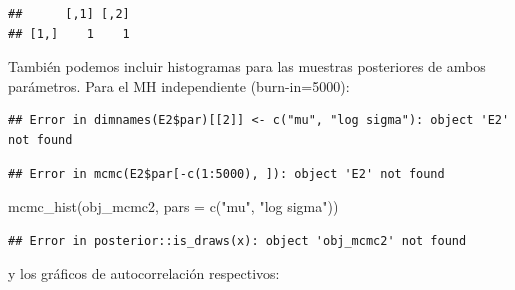 \documentclass[
  12pt,
]{book}
\newenvironment{Shaded}{\begin{snugshade}}{\end{snugshade}}
\newcommand{\AttributeTok}[1]{\textcolor[rgb]{0.77,0.63,0.00}{#1}}
\newcommand{\DecValTok}[1]{\textcolor[rgb]{0.00,0.00,0.81}{#1}}
\newcommand{\FunctionTok}[1]{\textcolor[rgb]{0.00,0.00,0.00}{#1}}
\newcommand{\NormalTok}[1]{#1}
\newcommand{\OtherTok}[1]{\textcolor[rgb]{0.56,0.35,0.01}{#1}}
\newcommand{\SpecialCharTok}[1]{\textcolor[rgb]{0.00,0.00,0.00}{#1}}
\newcommand{\StringTok}[1]{\textcolor[rgb]{0.31,0.60,0.02}{#1}}
\theoremstyle{definition}
\theoremstyle{definition}
\theoremstyle{definition}
\theoremstyle{definition}
\theoremstyle{remark}
\begin{document}
\begin{verbatim}
##      [,1] [,2]
## [1,]    1    1
\end{verbatim}

También podemos incluir histogramas para las muestras posteriores de ambos parámetros. Para el MH independiente (burn-in=5000):

\begin{Shaded}
\end{Shaded}

\begin{verbatim}
## Error in dimnames(E2$par)[[2]] <- c("mu", "log sigma"): object 'E2' not found
\end{verbatim}

\begin{Shaded}
\end{Shaded}

\begin{verbatim}
## Error in mcmc(E2$par[-c(1:5000), ]): object 'E2' not found
\end{verbatim}

\begin{Shaded}
\begin{Highlighting}[]
\FunctionTok{mcmc\_hist}\NormalTok{(obj\_mcmc2, }\AttributeTok{pars =} \FunctionTok{c}\NormalTok{(}\StringTok{"mu"}\NormalTok{, }\StringTok{"log sigma"}\NormalTok{))}
\end{Highlighting}
\end{Shaded}

\begin{verbatim}
## Error in posterior::is_draws(x): object 'obj_mcmc2' not found
\end{verbatim}

y los gráficos de autocorrelación respectivos:
\end{document}
